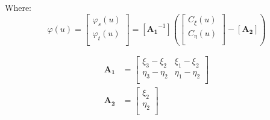 \documentclass[12pt, a4paper]{report}
\begin{document}
Where:
\begin{equation}
   \varphi(u) = 
\begin{bmatrix}
  \varphi_s(u) \\
    \varphi_t(u) \\    
\end{bmatrix} = [\boldsymbol{A_1}^{-1}] \left( \begin{bmatrix}
  C_{\xi}(u) \\
  C_{\eta}(u) \\    
\end{bmatrix} - [\boldsymbol{A_2}] \right)
\end{equation}

\begin{align}
\boldsymbol{A_1} &= \begin{bmatrix}
    \xi_3-\xi_2 & \xi_1-\xi_2 \\
    \eta_3-\eta_2 & \eta_1-\eta_2\\
\end{bmatrix}\\
 \boldsymbol{A_2} &= \begin{bmatrix}
    \xi_2 \\
    \eta_2 \\
\end{bmatrix}
\end{align}
\end{document}

